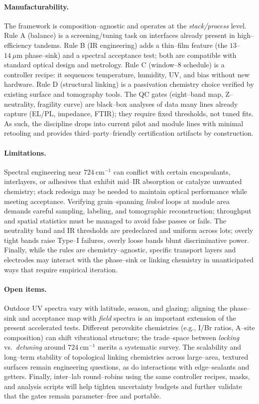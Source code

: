\documentclass[12pt]{article}
\begin{document}
\paragraph{Manufacturability.}
The framework is composition–agnostic and operates at the \emph{stack/process} level. Rule A (balance) is a screening/tuning task on interfaces already present in high–efficiency tandems. Rule B (IR engineering) adds a thin–film feature (the $13$–$14~\mu\mathrm{m}$ phase–sink) and a spectral acceptance test; both are compatible with standard optical design and metrology. Rule C (window–8 schedule) is a controller recipe: it sequences temperature, humidity, UV, and bias without new hardware. Rule D (structural linking) is a passivation chemistry choice verified by existing surface and tomography tools. The QC gates (eight–band map, Z–neutrality, fragility curve) are black–box analyses of data many lines already capture (EL/PL, impedance, FTIR); they require fixed thresholds, not tuned fits. As such, the discipline drops into current pilot and module lines with minimal retooling and provides third–party–friendly certification artifacts by construction.

\paragraph{Limitations.}
Spectral engineering near $724~\mathrm{cm}^{-1}$ can conflict with certain encapsulants, interlayers, or adhesives that exhibit mid–IR absorption or catalyze unwanted chemistry; stack redesign may be needed to maintain optical performance while meeting acceptance. Verifying grain–spanning \emph{linked} loops at module area demands careful sampling, labeling, and tomographic reconstruction; throughput and spatial statistics must be managed to avoid false passes or fails. The neutrality band and IR thresholds are predeclared and uniform across lots; overly tight bands raise Type–I failures, overly loose bands blunt discriminative power. Finally, while the rules are chemistry–agnostic, specific transport layers and electrodes may interact with the phase–sink or linking chemistry in unanticipated ways that require empirical iteration.

\paragraph{Open items.}
Outdoor UV spectra vary with latitude, season, and glazing; aligning the phase–sink and acceptance map with \emph{field} spectra is an important extension of the present accelerated tests. Different perovskite chemistries (e.g., I/Br ratios, A–site composition) can shift vibrational structure; the trade–space between \emph{locking} vs.\ \emph{detuning} around $724~\mathrm{cm}^{-1}$ merits a systematic survey. The scalability and long–term stability of topological linking chemistries across large–area, textured surfaces remain engineering questions, as do interactions with edge–sealants and getters. Finally, inter–lab round–robins using the same controller recipes, masks, and analysis scripts will help tighten uncertainty budgets and further validate that the gates remain parameter–free and portable.
\end{document}
